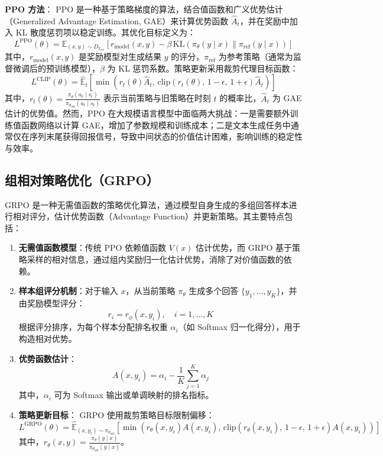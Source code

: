 \documentclass{pkuthesis}
\begin{document}
\textbf{PPO 方法}：  
PPO 是一种基于策略梯度的算法，结合值函数和广义优势估计（Generalized Advantage Estimation, GAE）来计算优势函数 \( \hat{A}_t \)，并在奖励中加入 KL 散度惩罚项以稳定训练。其优化目标定义为：
\[
L^{\text{PPO}}(\theta) = \mathbb{E}_{(x, y) \sim D_{\pi_{\text{ref}}}} \left[ r_{\text{model}}(x, y) - \beta \, \text{KL}(\pi_{\theta}(y \mid x) \| \pi_{\text{ref}}(y \mid x)) \right]
\]
其中，\( r_{\text{model}}(x, y) \) 是奖励模型对生成结果 \( y \) 的评分，\( \pi_{\text{ref}} \) 为参考策略（通常为监督微调后的预训练模型），\( \beta \) 为 KL 惩罚系数。策略更新采用裁剪代理目标函数：
\[
L^{\text{CLIP}}(\theta) = \hat{\mathbb{E}}_t \left[ \min \left( r_t(\theta) \hat{A}_t, \, \text{clip}(r_t(\theta), \, 1 - \epsilon, \, 1 + \epsilon) \hat{A}_t \right) \right]
\]
其中，\( r_t(\theta) = \frac{\pi_{\theta}(a_t \mid s_t)}{\pi_{\theta_{\text{old}}}(a_t \mid s_t)} \) 表示当前策略与旧策略在时刻 \( t \) 的概率比，\( \hat{A}_t \) 为 GAE 估计的优势值。然而，PPO 在大规模语言模型中面临两大挑战：一是需要额外训练值函数网络以计算 GAE，增加了参数规模和训练成本；二是文本生成任务中通常仅在序列末尾获得回报信号，导致中间状态的价值估计困难，影响训练的稳定性与效率。

\subsection{组相对策略优化（GRPO）}
GRPO 是一种无需值函数的策略优化算法，通过模型自身生成的多组回答样本进行相对评分，估计优势函数（Advantage Function）并更新策略。其主要特点包括：
\begin{enumerate}
    \item \textbf{无需值函数模型}：传统 PPO 依赖值函数 \( V(x) \) 估计优势，而 GRPO 基于策略采样的相对信息，通过组内奖励归一化估计优势，消除了对价值函数的依赖。
    \item \textbf{样本组评分机制}：对于输入 \( x \)，从当前策略 \( \pi_{\theta} \) 生成多个回答 \( \{y_1, \dots, y_K\} \)，并由奖励模型评分：
    \[
    r_i = r_{\phi}(x, y_i), \quad i = 1, \dots, K
    \]
    根据评分排序，为每个样本分配排名权重 \( \alpha_i \)（如 Softmax 归一化得分），用于构造相对优势。
    \item \textbf{优势函数估计}：
    \[
    A(x, y_i) = \alpha_i - \frac{1}{K} \sum_{j=1}^K \alpha_j
    \]
    其中，\( \alpha_i \) 可为 Softmax 输出或单调映射的排名指标。
    \item \textbf{策略更新目标}：
    GRPO 使用裁剪策略目标限制偏移：
    \[
    L^{\text{GRPO}}(\theta) = \hat{\mathbb{E}}_{(x, y_i) \sim \pi_{\theta_{\text{old}}}} \left[ \min \left( r_{\theta}(x, y_i) A(x, y_i), \, \text{clip}(r_{\theta}(x, y_i), \, 1 - \epsilon, \, 1 + \epsilon) A(x, y_i) \right) \right]
    \]
    其中，\( r_{\theta}(x, y) = \frac{\pi_{\theta}(y \mid x)}{\pi_{\theta_{\text{old}}}(y \mid x)} \)。
\end{enumerate}
\end{document}
